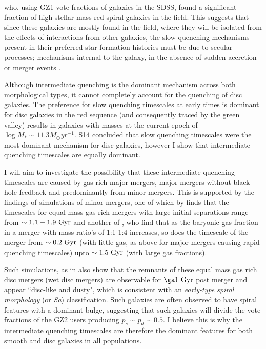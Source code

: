 \documentclass{mn2e}
\begin{document}
\citet{Bamford09} who, using GZ1 vote fractions of galaxies in the SDSS, found a significant fraction of high stellar mass red spiral galaxies in the field. This suggests that since these galaxies are mostly found in the field, where they will be isolated from the effects of interactions from other galaxies, the slow quenching mechanisms present in their preferred star formation histories must be due to secular processes; mechanisms internal to the galaxy, in the absence of sudden accretion or merger events \citep{KK04, Sheth12}.

Although intermediate quenching is the dominant mechanism across both morphological types, it cannot completely account for the quenching of disc galaxies. The preference for slow quenching timescales at early times is dominant for disc galaxies in the red sequence (and consequently traced by the green valley) results in galaxies with masses at the current epoch of $\log M_* \sim 11.3 M_{\odot} yr^{-1}$. S14 concluded that slow quenching timescales were the most dominant mechanism for disc galaxies, however I show that intermediate quenching timescales are equally dominant. 

I will aim to investigate the possibility that these intermediate quenching timescales are caused by gas rich major mergers, major mergers without black hole feedback and predominantly from minor mergers. This is supported by the findings of simulations of minor mergers, one of which by \citet{Lotz08} finds that the timescales for equal mass gas rich mergers with large initial separations range from $\sim 1.1-1.9~\rm{Gyr}$ and another of \citet{Lotz11}, who find that as the baryonic gas fraction in a merger with mass ratio's of 1:1-1:4 increases, so does the timescale of the merger from $\sim0.2~\rm{Gyr}$ (with little gas, as above for major mergers causing rapid quenching timescales) upto $\sim1.5~\rm{Gyr}$ (with large gas fractions). 

Such simulations, as in \citet{Lotz08} also show that the remnants of these equal mass gas rich disc mergers (wet disc mergers) are observable for $\ga1~\rm{Gyr}$ post merger and appear ``disc-like and dusty", which is consistent with an \emph{early-type spiral morphology} (or \emph{Sa}) classification.  Such galaxies are often observed to have spiral features with a dominant bulge, suggesting that such galaxies will divide the vote fractions of the GZ2 users producing $p_s \sim p_d \sim 0.5$. I believe this is why the intermediate quenching timescales are therefore the dominant features for both smooth and disc galaxies in all populations.
\end{document}
